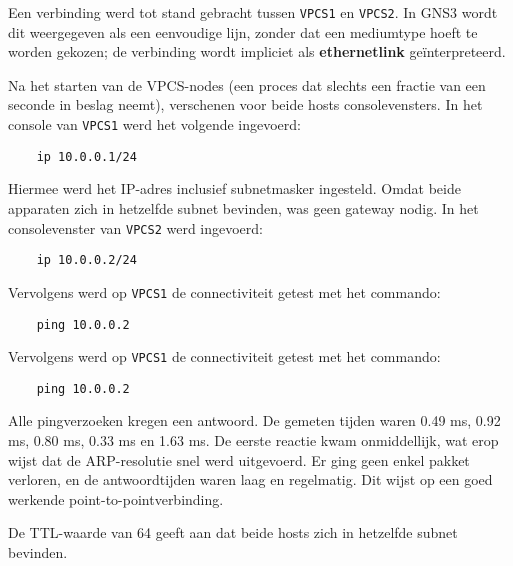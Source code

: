 Een verbinding werd tot stand gebracht tussen \texttt{VPCS1} en \texttt{VPCS2}. In GNS3 wordt dit weergegeven als een eenvoudige lijn, zonder dat een mediumtype hoeft te worden gekozen; de verbinding wordt impliciet als \textbf{ethernetlink} geïnterpreteerd.

Na het starten van de VPCS-nodes (een proces dat slechts een fractie van een seconde in beslag neemt), verschenen voor beide hosts consolevensters. In het console van \texttt{VPCS1} werd het volgende ingevoerd:

\begin{verbatim}
    ip 10.0.0.1/24
\end{verbatim}

Hiermee werd het IP-adres inclusief subnetmasker ingesteld. Omdat beide apparaten zich in hetzelfde subnet bevinden, was geen gateway nodig. In het consolevenster van \texttt{VPCS2} werd ingevoerd:

\begin{verbatim}
    ip 10.0.0.2/24
\end{verbatim}

Vervolgens werd op \texttt{VPCS1} de connectiviteit getest met het commando:

\begin{verbatim}
    ping 10.0.0.2
\end{verbatim}

Vervolgens werd op \texttt{VPCS1} de connectiviteit getest met het commando:

\begin{verbatim}
    ping 10.0.0.2
\end{verbatim}

Alle pingverzoeken kregen een antwoord. De gemeten tijden waren 0.49 ms, 0.92 ms, 0.80 ms, 0.33 ms en 1.63 ms. De eerste reactie kwam onmiddellijk, wat erop wijst dat de ARP-resolutie snel werd uitgevoerd. Er ging geen enkel pakket verloren, en de antwoordtijden waren laag en regelmatig. Dit wijst op een goed werkende point-to-pointverbinding.

De TTL-waarde van 64 geeft aan dat beide hosts zich in hetzelfde subnet bevinden.


